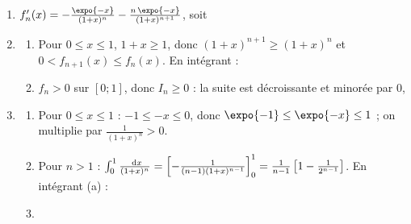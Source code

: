 \begin{description}
\begin{enumerate}
\begin{enumerate}
\begin{center}
				\end{center}
		\end{enumerate}
	\end{enumerate}
	\item[Partie B]
	\begin{enumerate}
		\item {}
			$f_n'(x) = -\frac{\expo{-x}}{(1+x)^n} - \frac{n\,\expo{-x}}{(1+x)^{n+1}}$, soit \par\noindent{}
		\item
		\begin{enumerate}
			\item {}
				Pour $0 \leq x \leq 1$, $1 + x \geq 1$, donc $(1+x)^{n+1} \geq (1+x)^n$ et $0 < f_{n+1}(x) \leq f_n(x)$. En intégrant :
				\par\noindent{}
			\item {}
				$f_n > 0$ sur $[0;1]$, donc $I_n \geq 0$ : la suite est décroissante et minorée par $0$, \par\noindent{}
		\end{enumerate}
		\item
		\begin{enumerate}
			\item {}
				Pour $0 \leq x \leq 1$ : $-1 \leq -x \leq 0$, donc $\expo{-1} \leq \expo{-x} \leq 1$ ; on multiplie par $\frac{1}{(1+x)^n} > 0$.
				\par\noindent{}
			\item {}
				Pour $n > 1$ : $\int_0^1 \frac{~\mathrm{d}x}{(1+x)^n} = \left[-\frac{1}{(n-1)(1+x)^{n-1}}\right]_0^1 = \frac{1}{n-1}\left[1 - \frac{1}{2^{n-1}}\right]$. En intégrant (a) :
				\par\noindent{}
			\item {}

\end{enumerate}
\end{enumerate}
\end{description}
